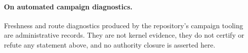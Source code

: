 \documentclass[11pt,a4paper]{article}
\theoremstyle{plain}
\theoremstyle{definition}
\theoremstyle{remark}
\begin{document}
\paragraph{On automated campaign diagnostics.}
Freshness and route diagnostics produced by the repository's campaign tooling
are administrative records. They are not kernel evidence, they do not certify
or refute any statement above, and no authority closure is asserted here.



\end{document}
